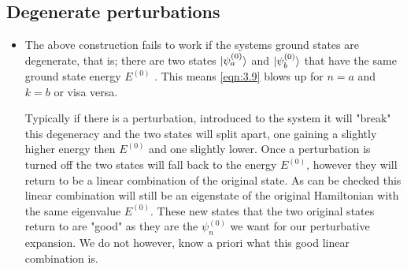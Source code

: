 \documentclass[11pt]{article}
\numberwithin{equation}{section}
\begin{document}
\subsection{Degenerate perturbations}
\begin{itemize}
    \item The above construction fails to work if the systems ground states are degenerate, that is; there are two states $\ket{\psi_a^{(0)}}$ and $\ket{\psi_b^{(0)}}$ that have the same ground state energy $E^{(0)}$ . This means \ref{eqn:3.9} blows up for $n=a$ and $k=b$ or visa versa.  

Typically if there is a perturbation, introduced to the system it will "break" this degeneracy and the two states will split apart, one gaining a slightly higher energy then $E^{(0)}$ and one slightly lower. Once a perturbation is turned off the two states will fall back to the energy $E^{(0)}$, however they will return to be a linear combination of the original state. As can be checked this linear combination will still be an eigenstate of the original Hamiltonian with the same eigenvalue $E^{(0)}$. These new states that the two original states return to are "good" as they are the $\psi_n^{(0)}$ we want for our perturbative expansion. We do not however,  know a priori what this good linear combination is. 


\end{itemize}
\end{document}
